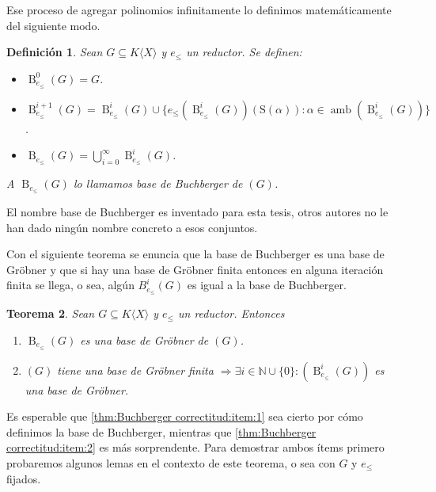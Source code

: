 \documentclass[12pt]{report}
\theoremstyle{customstyle}
\newtheorem{theorem}{Teorema}[chapter]
\newtheorem{definition}[theorem]{Definición}
\theoremstyle{factstyle}
\DeclareMathOperator{\amb}{amb}
\renewcommand{\S}{\text{S}}
\DeclareMathOperator{\B}{B}
\begin{document}
Ese proceso de agregar polinomios infinitamente lo definimos matemáticamente del siguiente modo.

\begin{definition}
  Sean $G ⊆ K⟨X⟩$ y $e_≤$ un reductor. Se definen:
  \begin{itemize}
    \item $\B_{e_≤}^0(G) = G$.
    \item $\B_{e_≤}^{i + 1}(G) = \B_{e_≤}^i(G) ∪ \{e_≤(\B_{e_≤}^i(G))(\S(α)) : α ∈ \amb(\B_{e_≤}^i(G))\}$.
    \item $\B_{e_≤}(G) = ⋃_{i = 0}^∞ \B_{e_≤}^i(G)$.
  \end{itemize}
  A $\B_{e_≤}(G)$ lo llamamos base de Buchberger de $(G)$.
\end{definition}

El nombre base de Buchberger es inventado para esta tesis, otros autores no le han dado ningún nombre concreto a esos conjuntos.

Con el siguiente teorema se enuncia que la base de Buchberger es una base de Gröbner y que si hay una base de Gröbner finita entonces en alguna iteración finita se llega, o sea, algún $B_{e_≤}^{i}(G)$ es igual a la base de Buchberger.

\begin{theorem}\label{thm:Buchberger correctitud}
  Sean $G ⊆ K⟨X⟩$ y $e_≤$ un reductor. Entonces
  \begin{enumerate}
    \item $\B_{e_≤}(G)$ es una base de Gröbner de $(G)$. \label{thm:Buchberger correctitud:item:1}
    \item $(G)$ tiene una base de Gröbner finita $⇒ ∃i ∈ ℕ ∪ \{0\} : (\B_{e_≤}^i(G))$ es una base de Gröbner. \label{thm:Buchberger correctitud:item:2}
  \end{enumerate}
\end{theorem}

Es esperable que \ref{thm:Buchberger correctitud:item:1} sea cierto por cómo definimos la base de Buchberger, mientras que \ref{thm:Buchberger correctitud:item:2} es más sorprendente. Para demostrar ambos ítems primero probaremos algunos lemas en el contexto de este teorema, o sea con $G$ y $e_≤$ fijados.
\end{document}
